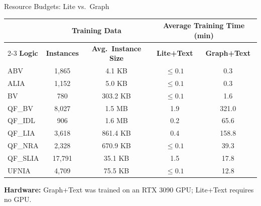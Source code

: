 \documentclass[aspectratio=169,11pt]{beamer}
\begin{document}
\begin{frame}{Resource Budgets: Lite vs.\ Graph}
  \centering
  \vspace{0.35em}
  \footnotesize
  \setlength{\tabcolsep}{0.85em}
  \renewcommand{\arraystretch}{1.24}
  \begin{tabular}{l c c c c}
      & \multicolumn{2}{c}{\textbf{Training Data}}
      & \multicolumn{2}{c}{\textbf{Average Training Time (min)}}\\[-0.15em]
    \cline{2-3}\cline{4-5}
    \textbf{Logic}
      & \textbf{Instances}
      & \textbf{Avg.\ Instance Size}
      & \textbf{Lite+Text}
      & \textbf{Graph+Text}\\ \hline
    ABV      & 1,865  & 4.1 KB    & $\leq 0.1$ & 0.3\\
    ALIA     & 1,152  & 5.0 KB    & $\leq 0.1$ & 0.3\\
    BV       & 780    & 303.2 KB  & $\leq 0.1$ & 1.6\\
    QF\_BV   & 8,027  & 1.5 MB    & 1.9        & 321.0\\
    QF\_IDL  & 906    & 1.6 MB    & 0.2        & 65.6\\
    QF\_LIA  & 3,618  & 861.4 KB  & 0.4        & 158.8\\
    QF\_NRA  & 2,328  & 670.9 KB  & $\leq 0.1$ & 39.3\\
    QF\_SLIA & 17,791 & 35.1 KB   & 1.5        & 17.8\\
    UFNIA    & 4,709  & 75.5 KB   & $\leq 0.1$ & 12.8\\ \hline
  \end{tabular}

  \vspace{0.9em}
  \small
  \textbf{Hardware:} Graph+Text was trained on an RTX 3090 GPU;
  Lite+Text requires no GPU.

\end{frame}
\end{document}
